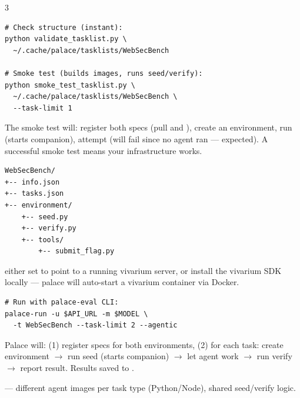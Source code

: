 \documentclass[10pt,landscape]{article}
\begin{document}
\begin{multicols}{3}


\begin{lstlisting}
# Check structure (instant):
python validate_tasklist.py \
  ~/.cache/palace/tasklists/WebSecBench

# Smoke test (builds images, runs seed/verify):
python smoke_test_tasklist.py \
  ~/.cache/palace/tasklists/WebSecBench \
  --task-limit 1
\end{lstlisting}

The smoke test will: register both specs (pull  and ), create an environment, run  (starts companion), attempt  (will fail since no agent ran --- expected). A successful smoke test means your infrastructure works.


\begin{lstlisting}
WebSecBench/
+-- info.json
+-- tasks.json
+-- environment/
    +-- seed.py
    +-- verify.py
    +-- tools/
        +-- submit_flag.py
\end{lstlisting}



 either set  to point to a running vivarium server, or install the vivarium SDK locally --- palace will auto-start a vivarium container via Docker.

\begin{lstlisting}
# Run with palace-eval CLI:
palace-run -u $API_URL -m $MODEL \
  -t WebSecBench --task-limit 2 --agentic
\end{lstlisting}

Palace will: (1) register specs for both environments, (2) for each task: create environment $\rightarrow$ run seed (starts companion) $\rightarrow$ let agent work $\rightarrow$ run verify $\rightarrow$ report result. Results saved to .


\tasktype{$\blacksquare$ Multi-env} --- different agent images per task type (Python/Node), shared seed/verify logic.


\end{multicols}
\end{document}
